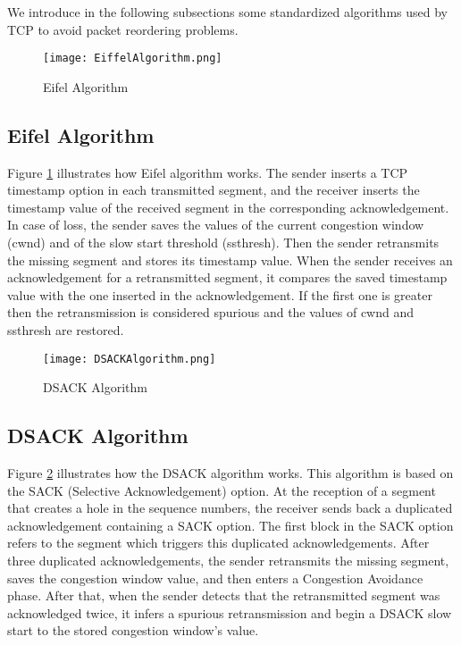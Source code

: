 \documentclass{sig-alternate}
\begin{document}
We introduce in the following subsections some standardized algorithms \cite{leung07} used by TCP to avoid packet reordering problems.


\begin{figure}[h]
\centering
\texttt{[image: EiffelAlgorithm.png]} 
\caption{Eifel Algorithm}
\label{EiffelAlgo}
\end{figure} 


\subsection{Eifel Algorithm}

Figure \ref{EiffelAlgo} illustrates how Eifel algorithm \cite{EifelRFC} \cite{Eifel} works. The sender inserts a TCP timestamp option in each transmitted segment, and the receiver inserts the timestamp value of the received segment in the corresponding acknowledgement. In case of loss, the sender saves the values of the current congestion window (cwnd) and of the slow start threshold (ssthresh). Then the sender retransmits the missing segment and stores its timestamp value. When the sender receives an acknowledgement for a retransmitted segment, it compares the saved timestamp value with the one inserted in the acknowledgement. If the first one is greater then the retransmission is considered spurious and the values of cwnd and ssthresh are restored.


\begin{figure}[h]
\centering
\texttt{[image: DSACKAlgorithm.png]} 
\caption{DSACK Algorithm}
\label{DsackAlgo}
\end{figure} 


\subsection{DSACK Algorithm}

Figure \ref{DsackAlgo} illustrates how the DSACK algorithm \cite{DsackRFC} works. This algorithm is based on the SACK (Selective Acknowledgement) option. At the reception of a segment that creates a hole in the sequence numbers, the receiver sends back a duplicated acknowledgement containing a SACK option. The first block in the SACK option refers to the segment which triggers this duplicated acknowledgements. After three duplicated acknowledgements, the sender retransmits the missing segment, saves the congestion window value, and then enters a Congestion Avoidance phase. After that, when the sender detects that the retransmitted segment was acknowledged twice, it infers a spurious retransmission and begin a DSACK slow start to the stored congestion window's value.
\end{document}
